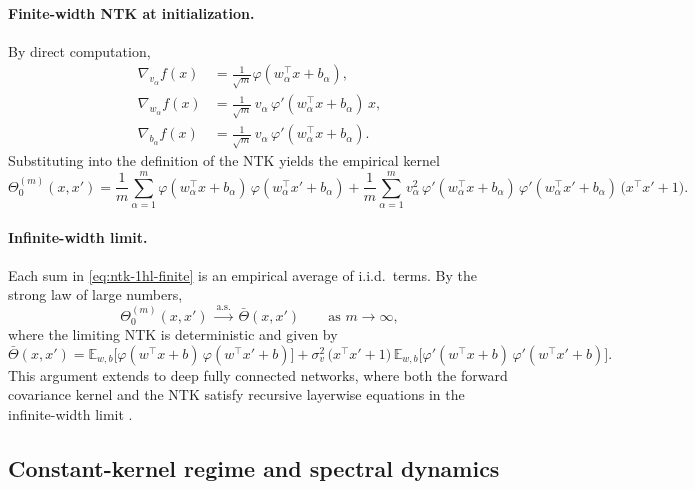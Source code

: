 \paragraph{Finite-width NTK at initialization.}
By direct computation,
\begin{align}
	\nabla_{v_\alpha} f(x)
	 & = \frac{1}{\sqrt{m}}\varphi(w_\alpha^\top x + b_\alpha),                 \\
	\nabla_{w_\alpha} f(x)
	 & = \frac{1}{\sqrt{m}}\,v_\alpha\,\varphi'(w_\alpha^\top x + b_\alpha)\,x, \\
	\nabla_{b_\alpha} f(x)
	 & = \frac{1}{\sqrt{m}}\,v_\alpha\,\varphi'(w_\alpha^\top x + b_\alpha).
\end{align}
Substituting into the definition of the NTK yields the empirical kernel
\begin{equation}
	\Theta_0^{(m)}(x,x')
	=
	\frac{1}{m}\sum_{\alpha=1}^m
	\varphi(w_\alpha^\top x + b_\alpha)\,\varphi(w_\alpha^\top x' + b_\alpha)
	+
	\frac{1}{m}\sum_{\alpha=1}^m
	v_\alpha^2\,
	\varphi'(w_\alpha^\top x + b_\alpha)\,
	\varphi'(w_\alpha^\top x' + b_\alpha)\,
	\bigl(x^\top x' + 1\bigr).
	\label{eq:ntk-1hl-finite}
\end{equation}

\paragraph{Infinite-width limit.}
Each sum in \eqref{eq:ntk-1hl-finite} is an empirical average of i.i.d.\ terms.
By the strong law of large numbers,
\[
	\Theta_0^{(m)}(x,x')
	\;\xrightarrow{\text{a.s.}}\;
	\bar\Theta(x,x')
	\qquad \text{as } m \to \infty,
\]
where the limiting NTK is deterministic and given by
\begin{equation}
	\bar\Theta(x,x')
	=
	\mathbb{E}_{w,b}\!\big[\varphi(w^\top x + b)\,\varphi(w^\top x' + b)\big]
	+
	\sigma_v^2\,\bigl(x^\top x' + 1\bigr)\,
	\mathbb{E}_{w,b}\!\big[\varphi'(w^\top x + b)\,\varphi'(w^\top x' + b)\big].
	\label{eq:ntk-1hl-infinite}
\end{equation}
This argument extends to deep fully connected networks, where both the forward
covariance kernel and the NTK satisfy recursive layerwise equations in the
infinite-width limit \citep{jacot2018ntk, lee2020wide}.

\subsection{Constant-kernel regime and spectral dynamics}\label{sec:ntk-spectral-dynamics}


